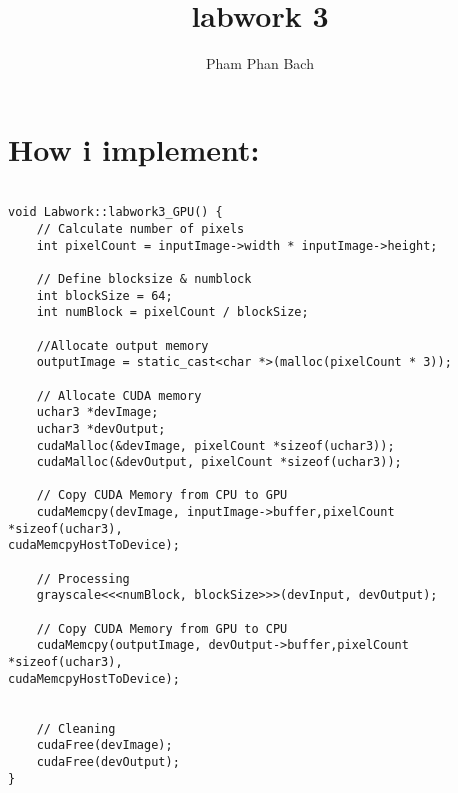 \documentclass{article}
\title{labwork 3}
\author{Pham Phan Bach }
\begin{document}
\maketitle
    

\section{How i implement:}
\begin{verbatim}
    
void Labwork::labwork3_GPU() {
    // Calculate number of pixels
    int pixelCount = inputImage->width * inputImage->height;

    // Define blocksize & numblock
    int blockSize = 64;
    int numBlock = pixelCount / blockSize;

    //Allocate output memory
    outputImage = static_cast<char *>(malloc(pixelCount * 3));

    // Allocate CUDA memory    
    uchar3 *devImage;
    uchar3 *devOutput;
    cudaMalloc(&devImage, pixelCount *sizeof(uchar3));
    cudaMalloc(&devOutput, pixelCount *sizeof(uchar3));
    
    // Copy CUDA Memory from CPU to GPU
    cudaMemcpy(devImage, inputImage->buffer,pixelCount *sizeof(uchar3),
cudaMemcpyHostToDevice);
    
    // Processing
    grayscale<<<numBlock, blockSize>>>(devInput, devOutput);

    // Copy CUDA Memory from GPU to CPU
    cudaMemcpy(outputImage, devOutput->buffer,pixelCount *sizeof(uchar3),
cudaMemcpyHostToDevice);


    // Cleaning
    cudaFree(devImage);
    cudaFree(devOutput);
}

\end{verbatim}{}
\end{document}
